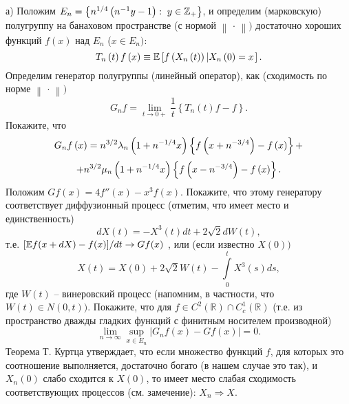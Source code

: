 \begin{problem}
а) Положим $E_n =\left\{ {n^{1 \mathord{\left/ {\vphantom {1 4}} 
\right. \kern-\nulldelimiterspace} 4}\left( {n^{-1}y-1} \right):\;y\in {\mathbb 
Z}_+ } \right\}$, и определим (марковскую) полугруппу на банаховом 
пространстве (с нормой $\left\| {\,\cdot \,} \right\|)$ достаточно хороших 
функций $f\left( x \right)$ над $E_n $ ($x\in E_n )$:
\[
T_n \left( t \right)f\left( x \right)\equiv \mathrm{{\mathbb E}}\left[ {f\left( {X_n \left( t 
\right)} \right)\left| {X_n \left( 0 \right)=x} \right.} \right].
\]
Определим генератор полугруппы (линейный оператор), как (сходимость по норме 
$\left\| {\,\cdot \,} \right\|)$
\[
G_n f=\mathop {\lim }\limits_{t\to 0+} \frac{1}{t}\left\{ {T_n \left( t 
\right)f-f} \right\}.
\]
Покажите, что
\[
G_n f\left( x \right)=n^{3 \mathord{\left/ {\vphantom {3 2}} \right. 
\kern-\nulldelimiterspace} 2}\lambda _n \left( {1+n^{-1 \mathord{\left/ 
{\vphantom {1 4}} \right. \kern-\nulldelimiterspace} 4}x} \right)\left\{ 
{f\left( {x+n^{-3 \mathord{\left/ {\vphantom {3 4}} \right. 
\kern-\nulldelimiterspace} 4}} \right)-f\left( x \right)} \right\}
+\]
\[+n^{3 
\mathord{\left/ {\vphantom {3 2}} \right. \kern-\nulldelimiterspace} 2}\mu 
_n \left( {1+n^{-1 \mathord{\left/ {\vphantom {1 4}} \right. 
\kern-\nulldelimiterspace} 4}x} \right)\left\{ {f\left( {x-n^{-3 
\mathord{\left/ {\vphantom {3 4}} \right. \kern-\nulldelimiterspace} 4}} 
\right)-f\left( x \right)} \right\}.
\]
Положим $Gf\left( x \right)=4{f}''\left( x \right)-x^3f\left( x \right)$. 
Покажите, что этому генератору соответствует диффузионный процесс (отметим, 
что имеет место и единственность) 
\[
dX\left( t \right)=-X^3\left( t \right)dt+2\sqrt 2 dW\left( t \right),
\]
т.е. $[\mathrm{{\mathbb E}} f(x + dX) - f(x)] / dt \to Gf(x)$ ,
или (если известно $X\left( 0 \right))$
\[
X\left( t \right)=X\left( 0 \right)+2\sqrt 2 W\left( t 
\right)-\int\limits_0^t {X^3\left( s \right)ds} ,
\]
где $W\left( t \right)$ -- винеровский процесс (напомним, в частности, что 
$W\left( t \right)\in N\left( {0,t} \right))$. Покажите, что для
 $f\in C^2\left( 
{\mathbb R} \right)\cap C_c^1 \left( {\mathbb R} \right)$ (т.е. из пространство дважды гладких функций с финитным носителем производной)
\[
\mathop {\lim }\limits_{n\to \infty } \mathop {\sup }\limits_{x\in E_n } 
\left| {G_n f\left( x \right)-Gf\left( x \right)} \right|=0.
\]
Теорема Т. Куртца утверждает, что если множество функций $f$, для которых 
это соотношение выполняется, достаточно богато (в нашем случае это так), и 
$X_n \left( 0 \right)$ слабо сходится к $X\left( 0 \right)$, то имеет место 
слабая сходимость соответствующих процессов (см. замечение): $X_n \Rightarrow X$. 


\end{problem}
